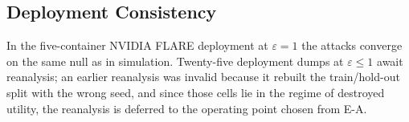 \subsection{Deployment Consistency}
\label{sec:results-nvflare}

In the five-container NVIDIA FLARE deployment at $\varepsilon = 1$ the attacks
converge on the same null as in simulation. Twenty-five deployment dumps at
$\varepsilon \le 1$ await reanalysis; an earlier reanalysis was invalid because
it rebuilt the train/hold-out split with the wrong seed, and since those cells
lie in the regime of destroyed utility, the reanalysis is deferred to the
operating point chosen from E-A. 
